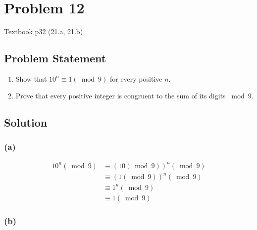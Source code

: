 \documentclass{article}
\begin{document}
\section*{Problem 12}

Textbook p32 (21.a, 21.b)

\subsection*{Problem Statement}

\begin{enumerate}[label=(\alph*)]
	\item Show that $10^n \equiv 1 (\bmod 9)$ for every positive $n$.
	\item Prove that every positive integer is congruent to the sum of its digits $\bmod 9$.
\end{enumerate}

\subsection*{Solution}

\subsubsection*{(a)}

\begin{align*}
	10^n (\bmod 9) & \equiv (10 (\bmod 9))^n (\bmod 9) \\
	               & \equiv (1 (\bmod 9))^n (\bmod 9)  \\
	               & \equiv 1^n (\bmod 9)              \\
	               & \equiv 1 (\bmod 9)
\end{align*}

\subsubsection*{(b)}
\end{document}
